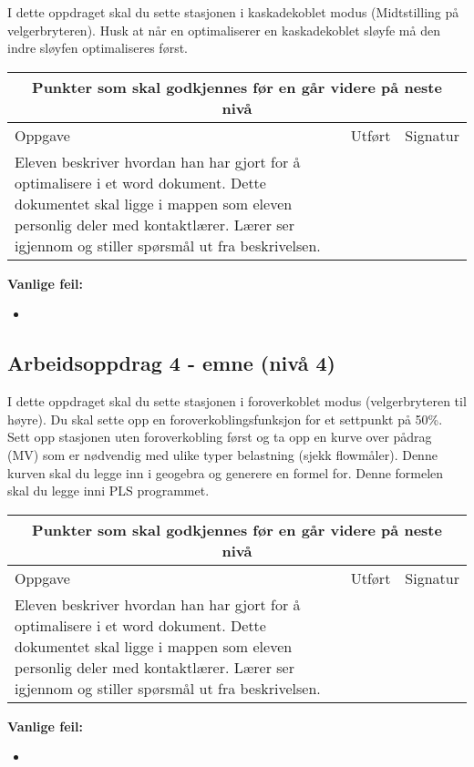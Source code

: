 I dette oppdraget skal du sette stasjonen i kaskadekoblet modus (Midtstilling på velgerbryteren). Husk at når en optimaliserer en kaskadekoblet sløyfe må den indre sløyfen optimaliseres først. 

\begin{center}
\begin{tabular}{ | m{8cm} | m{1cm}| m{2cm} | } 
\hline
\multicolumn{3}{|c|}{Punkter som skal godkjennes før en går videre på neste nivå} \\
	\hline
	Oppgave	& Utført & Signatur \\ 
	\hline
Eleven beskriver hvordan han har gjort for å optimalisere i et word dokument. Dette dokumentet skal ligge i mappen som eleven personlig deler med kontaktlærer. Lærer ser igjennom og stiller spørsmål ut fra beskrivelsen.& & \\ 
	\hline
\end{tabular}
\end{center}
\textbf{Vanlige feil:}
\begin{itemize}[noitemsep]
	\item 
\end{itemize}
\newpage

\subsection*{Arbeidsoppdrag 4 - emne (nivå 4)}

I dette oppdraget skal du sette stasjonen i foroverkoblet modus (velgerbryteren til høyre). Du skal sette opp en foroverkoblingsfunksjon for et settpunkt på 50\%. Sett opp stasjonen uten foroverkobling først og ta opp en kurve over pådrag (MV) som er nødvendig med ulike typer belastning (sjekk flowmåler). Denne kurven skal du legge inn i geogebra og generere en formel for. Denne formelen skal du legge inni PLS programmet. 
\begin{center}
\begin{tabular}{ | m{8cm} | m{1cm}| m{2cm} | } 
\hline
\multicolumn{3}{|c|}{Punkter som skal godkjennes før en går videre på neste nivå} \\
	\hline
	Oppgave	& Utført & Signatur \\ 
	\hline
Eleven beskriver hvordan han har gjort for å optimalisere i et word dokument. Dette dokumentet skal ligge i mappen som eleven personlig deler med kontaktlærer. Lærer ser igjennom og stiller spørsmål ut fra beskrivelsen.& & \\ 
	\hline
\end{tabular}
\end{center}
\textbf{Vanlige feil:}
\begin{itemize}[noitemsep]
	\item 
\end{itemize}
\newpage



